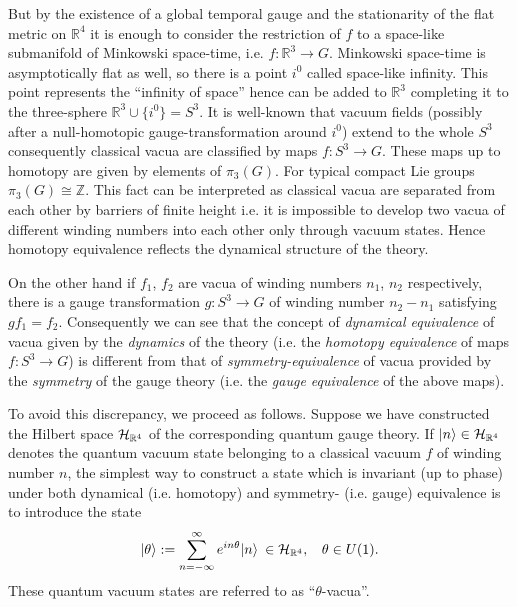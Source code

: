 \documentclass[a4paper,12pt,draft]{article}
\newcommand{\Z}{{\mathbb Z}}
\newcommand{\R}{{\mathbb R}}
\begin{document}
But by the existence of a global temporal gauge and the
stationarity of the flat metric on $\R^4$ it is enough to consider
the restriction of $f$ to a space-like submanifold of Minkowski
space-time, i.e. $f: \R^3\rightarrow G$. Minkowski space-time is
asymptotically flat as well, so there is a point $i^0$ called 
space-like infinity. This point represents the ``infinity of space''
hence can be added to $\R^3$ completing it to the
three-sphere $\R^3\cup\{i^0\}=S^3$. It is well-known that vacuum fields
(possibly after a null-homotopic gauge-transformation around $i^0$) 
extend to the whole $S^3$ consequently classical vacua are classified by
maps $f: S^3\rightarrow G$. These maps up to homotopy are given by
elements of $\pi_3 (G)$. For typical compact Lie groups $\pi_3(G)\cong\Z$. 
This fact can be interpreted as classical vacua are separated 
from each other by barriers of finite height i.e. it is impossible to
develop two vacua of different winding numbers into each other only
through vacuum states. Hence homotopy equivalence reflects the dynamical
structure of the theory.

On the other hand if $f_1$, $f_2$ are vacua of winding numbers $n_1$,
$n_2$ respectively, there is a gauge transformation $g: S^3\rightarrow G$
of winding number $n_2-n_1$ satisfying $gf_1=f_2$. Consequently we can see
that the concept of {\it dynamical equivalence} of vacua given by the {\it
dynamics} of the theory (i.e. the {\it homotopy equivalence} of maps $f:
S^3\rightarrow G$) is different from that of {\it symmetry-equivalence} of
vacua provided by the {\it symmetry} of the gauge theory (i.e. the {\it
gauge equivalence} of the above maps). 

To avoid this discrepancy, we proceed as follows. Suppose we have
constructed the Hilbert space ${\cal
H}_{\R^4}$ of the corresponding quantum gauge theory. If $\vert
n\rangle\in{\cal H}_{\R^4}$ denotes the  quantum vacuum state belonging to
a classical vacuum $f$ of winding number $n$, the simplest way to
construct a state which is invariant (up to phase) under both dynamical
(i.e. homotopy) and symmetry- (i.e. gauge)  equivalence is to introduce
the state
\begin{equation}
\vert\theta\rangle 
:=\sum\limits_{n=-\infty}^{\infty}e^{in\theta}\vert n\rangle\:\in{\cal
H}_{\R^4} ,\:\:\:\:\theta\in U(1).
\label{teta}
\end{equation}
These quantum vacuum states are referred to as ``$\theta$-vacua''. 
\end{document}
